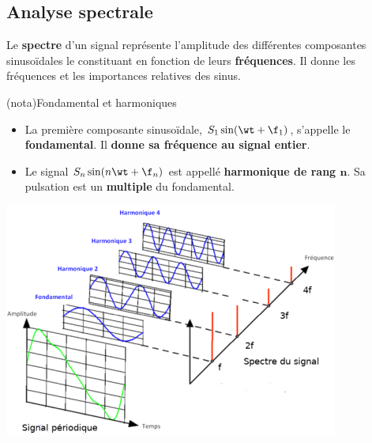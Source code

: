 \documentclass[../../main/main.tex]{subfiles}
\begin{document}
\subsection{Analyse spectrale}

\noindent
\begin{minipage}[t]{.48\linewidth}
	Le \textbf{spectre} d'un signal représente l'amplitude des différentes
	composantes sinusoïdales le constituant en fonction de leurs
	\textbf{fréquences}. Il donne les fréquences et les importances relatives des
	sinus.
	\begin{tcb}(nota){Fondamental et harmoniques}
		\begin{itemize}
			\item La première composante sinusoïdale, $S_1 \sin(\wt + \f_1)$,
			      s'appelle le \textbf{fondamental}. Il \textbf{donne sa fréquence au
				      signal entier}.
			\item Le signal $S_n \sin(n\wt + \f_n)$ est appellé
			      \textbf{harmonique de rang $\mathbf{n}$}. Sa pulsation est un
			      \textbf{multiple} du fondamental.
		\end{itemize}
	\end{tcb}
\end{minipage}
\hfill
\begin{minipage}[t]{.48\linewidth}
	\vspace{-10pt}
	\begin{center}
		\includegraphics[width=\linewidth]{decompo_fourier}
		\label{fig:fourier}
	\end{center}
\end{minipage}
\end{document}
